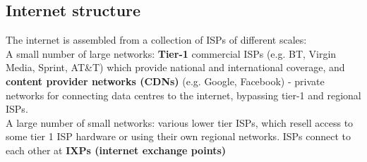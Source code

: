 \subsection{Internet structure} The internet is assembled from a collection of ISPs of different scales:\\
A small number of large networks: \textbf{Tier-1} commercial ISPs (e.g. BT, Virgin Media, Sprint, AT\&T) which provide national and international coverage, and \textbf{content provider networks (CDNs)} (e.g. Google, Facebook) - private networks for connecting data centres to the internet, bypassing tier-1 and regional ISPs.\\
A large number of small networks: various lower tier ISPs, which resell access to some tier 1 ISP hardware or using their own regional networks. ISPs connect to each other at \textbf{IXPs (internet exchange points)}
